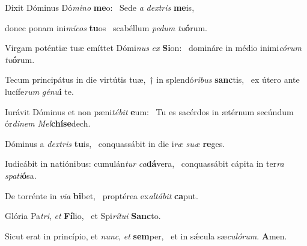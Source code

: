 \item Dixit Dóminus Dó\textit{mino} \textbf{me}o:~\psstar{} Sede \textit{a} \textit{dextris} \textbf{me}is,

\item donec ponam ini\textit{mícos} \textbf{tu}os~\psstar{} scabéllum \textit{pedum} \textit{tu}\textbf{ó}rum.

\item Virgam poténtiæ tuæ emíttet Dómi\textit{nus} \textit{ex} \textbf{Si}on:~\psstar{} domináre in médio inimi\textit{córum} \textit{tu}\textbf{ó}rum.

\item Tecum principátus in die virtútis tuæ,~† in splendó\textit{ribus} \textbf{sanc}tis,~\psstar{} ex útero ante lucífe\textit{rum} \textit{génu}\textbf{i} te.

\item Iurávit Dóminus et non pæni\textit{tébit} \textbf{e}um:~\psstar{} Tu es sacérdos in ætérnum secúndum ór\textit{dinem} \textit{Mel}\textbf{chí}\textbf{se}dech.

\item Dóminus a \textit{dextris} \textbf{tu}is,~\psstar{} conquassábit in die i\textit{ræ} \textit{suæ} \textbf{re}ges.

\item Iudicábit in natiónibus: cumulán\textit{tur} \textit{ca}\textbf{dá}vera,~\psstar{} conquassábit cápita in ter\textit{ra} \textit{spati}\textbf{ó}sa.

\item De torrénte in \textit{via} \textbf{bi}bet,~\psstar{} proptérea ex\textit{altábit} \textbf{ca}put.

\item Glória Pa\textit{tri}, \textit{et} \textbf{Fí}lio,~\psstar{} et Spi\textit{rítui} \textbf{Sanc}to.

\item Sicut erat in princípio, et \textit{nunc}, \textit{et} \textbf{sem}per,~\psstar{} et in sǽcula sæ\textit{culórum}. \textbf{A}men.